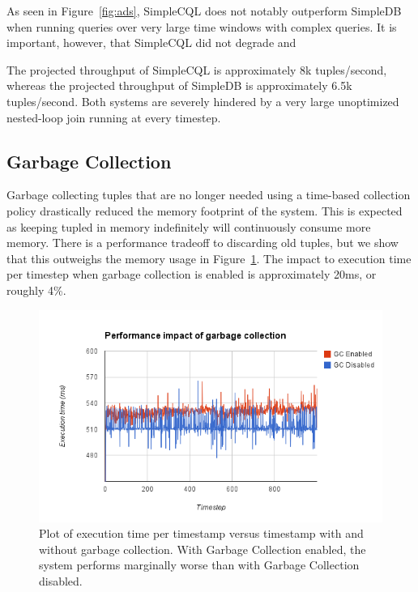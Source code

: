 \documentclass[a4paper, 10pt, conference]{IEEEconf}
\begin{document}
As seen in Figure~\ref{fig:ads}, SimpleCQL does not notably outperform SimpleDB when running queries over very large time windows with complex queries.  It is important, however, that SimpleCQL did not degrade and 

The projected throughput of SimpleCQL is approximately 8k tuples/second, whereas the projected throughput of SimpleDB is approximately 6.5k tuples/second.  Both systems are severely hindered by a very large unoptimized nested-loop join running at every timestep.

\subsection{Garbage Collection}
Garbage collecting tuples that are no longer needed using a time-based collection policy drastically reduced the memory footprint of the system.  This is expected as keeping tupled in memory indefinitely will continuously consume more memory.  There is a performance tradeoff to discarding old tuples, but we show that this outweighs the memory usage in Figure~\ref{fig:gc_perf}.  The impact to execution time per timestep when garbage collection is enabled is approximately 20ms, or roughly 4\%.

\begin{figure}[h!]
    \centering
    \centerline{\includegraphics[totalheight=5cm]{gc_perf.png}}
    \caption{Plot of execution time per timestamp versus timestamp with and without garbage collection. With Garbage Collection enabled, the system performs marginally worse than with Garbage Collection disabled.}
    \label{fig:gc_perf}
\end{figure}

\end{document}
